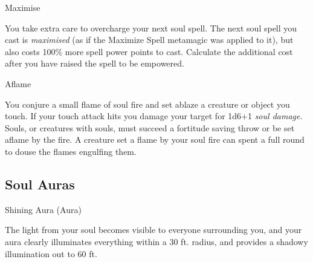 \begin{soulpower}{Maximise}
  \rangepersonal

  You take extra care to overcharge your next soul spell. The next soul spell
  you cast is \emph{maximised} (as if the Maximize Spell metamagic was applied
  to it), but also costs 100\% more spell power points to cast. Calculate the
  additional cost after you have raised the spell to be empowered.
\end{soulpower}

\begin{soulpower}{Aflame}

  You conjure a small flame of soul fire and set ablaze a creature or object
  you touch. If your touch attack hits you damage your target for 1d6+1
  \emph{soul damage}. Souls, or creatures with souls, must succeed a fortitude
  saving throw or be set aflame by the fire. A creature set a flame by your
  soul fire can spent a full round to douse the flames engulfing them.
\end{soulpower}

\subsection{Soul Auras}

\begin{soulpower}{Shining Aura (Aura)}
  \components{-}
  \rangepersonal

  The light from your soul becomes visible to everyone surrounding you, and
  your aura clearly illuminates everything within a 30 ft. radius, and
  provides a shadowy illumination out to 60 ft.
\end{soulpower}
